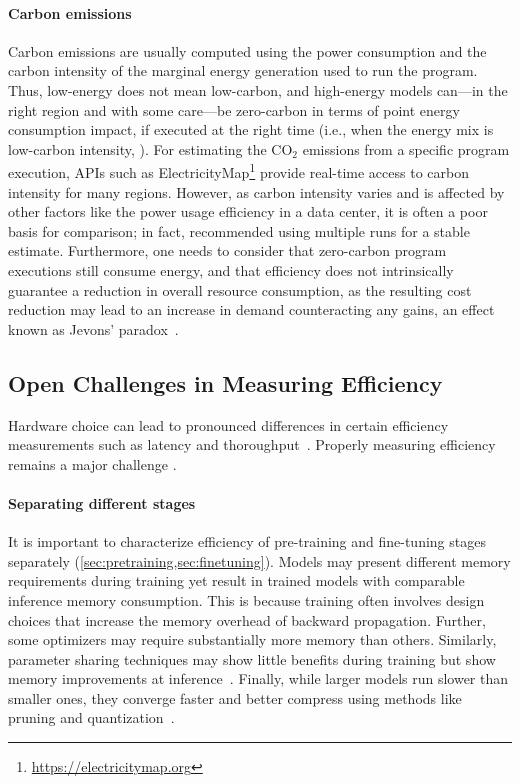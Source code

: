 \paragraph{Carbon emissions} Carbon emissions are usually computed using the power consumption and the carbon intensity of the marginal energy generation used to run the program. Thus, low-energy does not mean low-carbon, and high-energy models can---in the right region and with some care---be zero-carbon in terms of point energy consumption impact, if executed at the right time (i.e., when the energy mix is low-carbon intensity, \citealp{Dodge:2022}). 
For estimating the CO$_2$ emissions from a specific program execution, APIs such as ElectricityMap\footnote{\url{https://electricitymap.org}} provide real-time access to carbon intensity for many regions. However, as carbon intensity varies and is affected by other factors like the power usage efficiency in a data center, it is often a poor basis for comparison; in fact, \citet{henderson2020towards} recommended using multiple runs for a stable estimate. Furthermore, one needs to consider that zero-carbon program executions still consume energy, and that efficiency does not intrinsically guarantee a reduction in overall resource consumption, as the resulting cost reduction may lead to an increase in demand counteracting any gains, an effect known as Jevons' paradox~\cite{jevons1866coal}.

\subsection{Open Challenges in Measuring Efficiency}

Hardware choice can lead to pronounced differences in certain efficiency measurements such as latency and thoroughput~\citep{LeeThorp2021FNetMT}. Properly measuring efficiency remains a major challenge \citep{cao-etal-2020-towards}. 

\paragraph{Separating different stages} It is important to characterize efficiency of pre-training and fine-tuning stages separately (\ref{sec:pretraining,sec:finetuning}).
Models may present different memory requirements during training yet result in trained models with comparable inference memory consumption. This is because training often involves design choices that increase the memory overhead of backward propagation. Further, some optimizers may require substantially more memory than others. Similarly, parameter sharing techniques may show little benefits during training but show memory improvements at inference~\citep{dehghani2021}. Finally, while larger models run slower than smaller ones, they converge faster and better compress using methods like pruning and quantization~\cite{pmlr-v119-li20m}.

